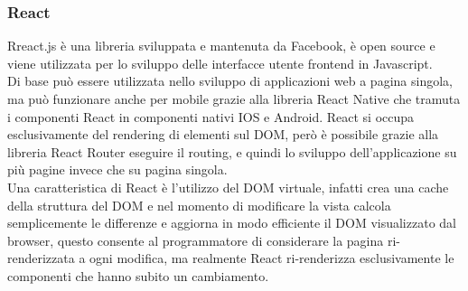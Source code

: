 \subsubsection{React}
Rreact.js è una libreria sviluppata e mantenuta da Facebook, è open source e viene utilizzata per lo sviluppo delle interfacce utente frontend in Javascript.\\
Di base può essere utilizzata nello sviluppo di applicazioni web a pagina singola, ma può funzionare anche per mobile grazie alla libreria React Native che tramuta i componenti React in componenti nativi IOS e Android. React si occupa esclusivamente del rendering di elementi sul DOM, però è possibile grazie alla libreria React Router eseguire il routing, e quindi lo sviluppo dell'applicazione su più pagine invece che su pagina singola.\\
Una caratteristica di React è l'utilizzo del DOM virtuale, infatti crea una cache della struttura del DOM e nel momento di modificare la vista calcola semplicemente le differenze e aggiorna in modo efficiente il DOM visualizzato dal browser, questo consente al programmatore di considerare la pagina ri-renderizzata a ogni modifica, ma realmente React ri-renderizza esclusivamente le componenti che hanno subito un cambiamento.\\

